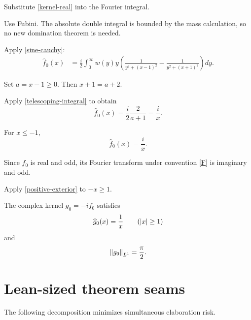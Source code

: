 \begin{proofoutline}
\item Substitute \eqref{kernel-real} into the Fourier integral.
\item Use Fubini. The absolute double integral is bounded by the mass calculation, so no new domination theorem is needed.
\item Apply \eqref{sine-cauchy}:
\begin{align*}
\widehat f_0(x)
&=\frac i2\int_0^\infty w(y)y
\left(
  \frac1{y^2+(x-1)^2}
 -\frac1{y^2+(x+1)^2}
\right)dy.
\end{align*}
\item Set $a=x-1\ge0$. Then $x+1=a+2$.
\item Apply \eqref{telescoping-integral} to obtain
\[
  \widehat f_0(x)=\frac i2\frac2{a+1}=\frac i x.
\]
\end{proofoutline}

\begin{theorem}
For $x\le-1$,
\begin{equation}
  \widehat f_0(x)=\frac{i}{x}.
  \tag{negative-exterior}\label{negative-exterior}
\end{equation}
\end{theorem}

\begin{proofoutline}
\item Since $f_0$ is real and odd, its Fourier transform under convention \eqref{F} is imaginary and odd.
\item Apply \eqref{positive-exterior} to $-x\ge1$.
\end{proofoutline}

\begin{corollary}
The complex kernel $g_0=-if_0$ satisfies
\[
  \widehat g_0(x)=\frac1x\qquad(\left\lvert x\right\rvert\ge1)
\]
and
\[
  \left\lVert g_0\right\rVert_{L^1}=\frac\pi2.
\]
\end{corollary}

\section{Lean-sized theorem seams}

The following decomposition minimizes simultaneous elaboration risk.

